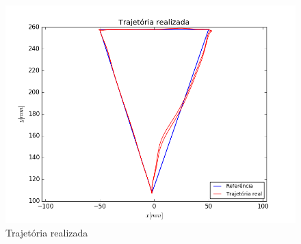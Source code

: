 \documentclass[]{politex}
\begin{document}
\begin{figure}[H]
	\centering
	\includegraphics[scale=0.39]{../../../Experimental/Aquisicoes/SMCt_triangulo/xy.png}  
	\caption{Trajetória realizada}
	\label{fig:SMCq_triangulo_xy}
\end{figure}
\end{document}
